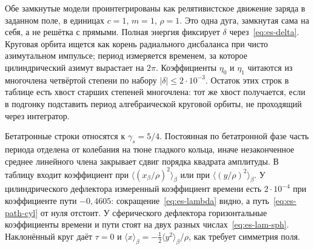 Обе замкнутые модели проинтегрированы как релятивистское движение заряда в заданном поле, в единицах $c=1$, $m=1$, $\rho=1$. Это одна дуга, замкнутая сама на себя, а не решётка с прямыми. Полная энергия фиксирует $\delta$ через~\eqref{eq:es-delta}. Круговая орбита ищется как корень радиального дисбаланса при чисто азимутальном импульсе; период измеряется временем, за которое цилиндрический азимут вырастает на $2\pi$. Коэффициенты $\eta_0$ и $\eta_1$ читаются из многочлена четвёртой степени по набору $|\delta|\le 2\cdot 10^{-3}$. Остаток этих строк в таблице есть хвост старших степеней многочлена: тот же хвост получается, если в подгонку подставить период алгебраической круговой орбиты, не проходящий через интегратор.

Бетатронные строки относятся к $\gamma_s=5/4$. Постоянная по бетатронной фазе часть периода отделена от колебания на тюне гладкого кольца, иначе незаконченное среднее линейного члена закрывает сдвиг порядка квадрата амплитуды. В таблицу входит коэффициент при $\langle(x_\beta/\rho)^2\rangle_\beta$ или при $\langle(y/\rho)^2\rangle_\beta$. У цилиндрического дефлектора измеренный коэффициент времени есть $2\cdot 10^{-4}$ при коэффициенте пути $-0{,}4605$: сокращение~\eqref{eq:es-lambda} видно, а путь~\eqref{eq:es-path-cyl} от нуля отстоит. У сферического дефлектора горизонтальные коэффициенты времени и пути стоят на двух разных числах~\eqref{eq:es-lam-sph}. Наклонённый круг даёт $\tau=0$ и $\langle x\rangle_\beta=-\frac12\langle y^2\rangle_\beta/\rho$, как требует симметрия поля.

